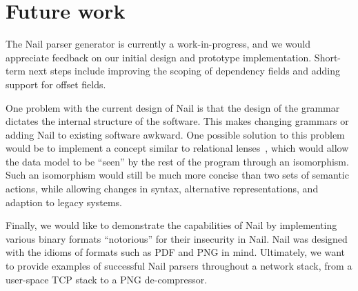 \section{Future work}
\label{s:future}

The Nail parser generator is currently a work-in-progress, and we would
appreciate feedback on our initial design and prototype implementation.
Short-term next steps include improving the scoping of dependency fields
and adding support for offset fields.

One problem with the current design of Nail is that the design of the
grammar dictates the internal structure of the software.  This makes
changing grammars or adding Nail to existing software awkward.
One possible solution to this problem would be to implement a concept
similar to relational lenses~\cite{bohannon2006relational}, which would
allow the data model to be ``seen'' by the rest of the program through
an isomorphism.  Such an isomorphism would still be much more concise
than two sets of semantic actions, while allowing changes in syntax,
alternative representations, and adaption to legacy systems.

Finally, we would like to demonstrate the capabilities of Nail by
implementing various binary formats ``notorious'' for their insecurity
in Nail. Nail was designed with the idioms of formats such as PDF and
PNG in mind. Ultimately, we want to provide examples of successful Nail
parsers throughout a network stack, from a user-space TCP stack to a
PNG de-compressor.

